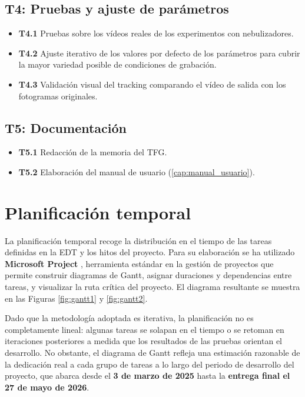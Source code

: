 \subsection{T4: Pruebas y ajuste de parámetros}
\begin{itemize}
    \item \textbf{T4.1} Pruebas sobre los vídeos reales de los experimentos con nebulizadores.
    \item \textbf{T4.2} Ajuste iterativo de los valores por defecto de los parámetros para cubrir la mayor variedad posible de condiciones de grabación.
    \item \textbf{T4.3} Validación visual del tracking comparando el vídeo de salida con los fotogramas originales.
\end{itemize}

\subsection{T5: Documentación}
\begin{itemize}
    \item \textbf{T5.1} Redacción de la memoria del TFG.
    \item \textbf{T5.2} Elaboración del manual de usuario (\ref{cap:manual_usuario}).
\end{itemize}

\section{Planificación temporal}

La planificación temporal recoge la distribución en el tiempo de las tareas definidas en la EDT y los hitos del proyecto. Para su elaboración se ha utilizado \textbf{Microsoft Project} \cite{microsoft_project}, herramienta estándar en la gestión de proyectos que permite construir diagramas de Gantt, asignar duraciones y dependencias entre tareas, y visualizar la ruta crítica del proyecto. El diagrama resultante se muestra en las Figuras \ref{fig:gantt1} y \ref{fig:gantt2}.

Dado que la metodología adoptada es iterativa, la planificación no es completamente lineal: algunas tareas se solapan en el tiempo o se retoman en iteraciones posteriores a medida que los resultados de las pruebas orientan el desarrollo. No obstante, el diagrama de Gantt refleja una estimación razonable de la dedicación real a cada grupo de tareas a lo largo del periodo de desarrollo del proyecto, que abarca desde el \textbf{3 de marzo de 2025} hasta la \textbf{entrega final el 27 de mayo de 2026}.
 
